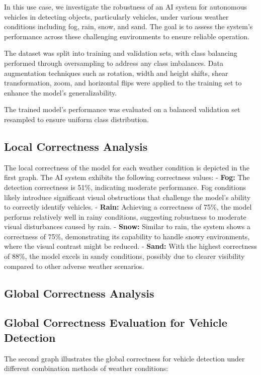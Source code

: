 In this use case, we investigate the robustness of an AI system for autonomous vehicles in detecting objects, particularly vehicles, under various weather conditions including fog, rain, snow, and sand. The goal is to assess the system's performance across these challenging environments to ensure reliable operation.

The dataset was split into training and validation sets, with class balancing performed through oversampling to address any class imbalances. Data augmentation techniques such as rotation, width and height shifts, shear transformation, zoom, and horizontal flips were applied to the training set to enhance the model's generalizability.

The trained model's performance was evaluated on a balanced validation set resampled to ensure uniform class distribution.

\subsection{Local Correctness Analysis}

The local correctness of the model for each weather condition is depicted in the first graph. The AI system exhibits the following correctness values:
- \textbf{Fog:} The detection correctness is 51\%, indicating moderate performance. Fog conditions likely introduce significant visual obstructions that challenge the model's ability to correctly identify vehicles.
- \textbf{Rain:} Achieving a correctness of 75\%, the model performs relatively well in rainy conditions, suggesting robustness to moderate visual disturbances caused by rain.
- \textbf{Snow:} Similar to rain, the system shows a correctness of 75\%, demonstrating its capability to handle snowy environments, where the visual contrast might be reduced.
- \textbf{Sand:} With the highest correctness of 88\%, the model excels in sandy conditions, possibly due to clearer visibility compared to other adverse weather scenarios.

\subsection{Global Correctness Analysis}

\subsection{Global Correctness Evaluation for Vehicle Detection}

The second graph illustrates the global correctness for vehicle detection under different combination methods of weather conditions:

